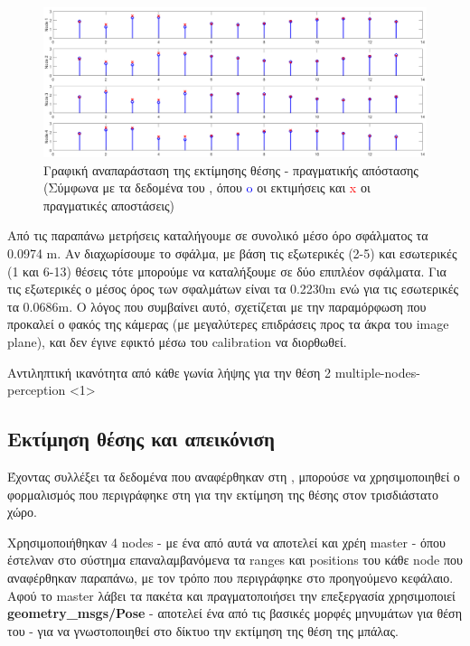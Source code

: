 \begin{figure}[H]
  \centering
  \includegraphics[width=0.9\linewidth]{../Images/Experiments-Results/nodes-estimations.png}
  \decoRule
  \caption[Γραφική αναπαράσταση της εκτίμησης θέσης - πραγματικής απόστασης]{Γραφική αναπαράσταση της εκτίμησης θέσης - πραγματικής απόστασης (Σύμφωνα με τα δεδομένα του , όπου \textcolor{blue}{o} οι εκτιμήσεις και \textcolor{red}{x} οι πραγματικές αποστάσεις)}
  \label{fig:est-act-dist-figure}
\end{figure}

Από τις παραπάνω μετρήσεις καταλήγουμε σε συνολικό μέσο όρο σφάλματος τα 0.0974 m. Αν διαχωρίσουμε το σφάλμα, με βάση τις εξωτερικές (2-5) και εσωτερικές (1 και 6-13) θέσεις τότε μπορούμε να καταλήξουμε σε δύο επιπλέον σφάλματα. Για τις εξωτερικές ο μέσος όρος των σφαλμάτων είναι τα 0.2230m ενώ για τις εσωτερικές τα 0.0686m. Ο λόγος που συμβαίνει αυτό, σχετίζεται με την παραμόρφωση που προκαλεί ο φακός της κάμερας (με μεγαλύτερες επιδράσεις προς τα άκρα του image plane), και δεν έγινε εφικτό μέσω του calibration να διορθωθεί.

{Αντιληπτική ικανότητα από κάθε γωνία λήψης για την θέση 2}%
{multiple-nodes-perception}%
<1>

\subsection{Εκτίμηση θέσης και απεικόνιση}
Έχοντας συλλέξει τα δεδομένα που αναφέρθηκαν στη , μπορούσε να χρησιμοποιηθεί ο φορμαλισμός που περιγράφηκε στη  για την εκτίμηση της θέσης στον τρισδιάστατο χώρο. 

Χρησιμοποιήθηκαν 4 nodes - με ένα από αυτά να αποτελεί και χρέη master - όπου έστελναν στο σύστημα επαναλαμβανόμενα τα ranges και positions του κάθε node που αναφέρθηκαν παραπάνω, με τον τρόπο που περιγράφηκε στο προηγούμενο κεφάλαιο. Αφού το master λάβει τα πακέτα και πραγματοποιήσει την επεξεργασία χρησιμοποιεί \textbf{geometry\_msgs/Pose} - αποτελεί ένα από τις βασικές μορφές μηνυμάτων για θέση του  - για να γνωστοποιηθεί στο δίκτυο την εκτίμηση της θέση της μπάλας.

